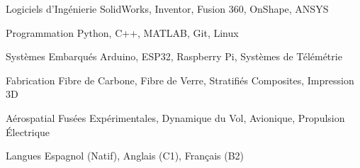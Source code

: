 \cvsection{\SkillsLabel}

\cvskill
{Logiciels d’Ingénierie}
{SolidWorks, Inventor, Fusion 360, OnShape, ANSYS}

\cvskill
{Programmation}
{Python, C++, MATLAB, Git, Linux}

\cvskill
{Systèmes Embarqués}
{Arduino, ESP32, Raspberry Pi, Systèmes de Télémétrie}

\cvskill
{Fabrication}
{Fibre de Carbone, Fibre de Verre, Stratifiés Composites, Impression 3D}

\cvskill
{Aérospatial}
{Fusées Expérimentales, Dynamique du Vol, Avionique, Propulsion Électrique}

\cvskill
{Langues}
{Espagnol (Natif), Anglais (C1), Français (B2)}
